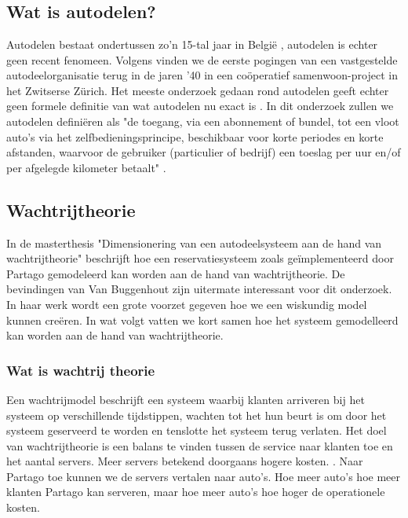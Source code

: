 \chapter{}
\label{ch:stand-van-zaken}



\section{Wat is autodelen?}
Autodelen bestaat ondertussen zo'n 15-tal jaar in België \autocite{ing}, autodelen is echter geen recent fenomeen. Volgens \textcite{millardball} vinden we de eerste pogingen van een vastgestelde autodeelorganisatie terug in de jaren '40 in een coöperatief samenwoon-project in het Zwitserse Zürich. Het meeste onderzoek gedaan rond autodelen geeft echter geen formele definitie van wat autodelen nu exact is \autocite{millardball}. In dit onderzoek zullen we autodelen definiëren als "de toegang, via een abonnement of bundel, tot een vloot auto's via het zelfbedieningsprincipe, beschikbaar voor korte periodes en korte afstanden, waarvoor de gebruiker (particulier of bedrijf) een toeslag per uur en/of per afgelegde kilometer betaalt" \autocite{ing}.

\section{Wachtrijtheorie}
In de masterthesis "Dimensionering van een autodeelsysteem aan de hand van wachtrijtheorie" beschrijft \textcite{van-buggenhout} hoe een reservatiesysteem zoals geïmplementeerd door Partago gemodeleerd kan worden aan de hand van wachtrijtheorie. De bevindingen van Van Buggenhout zijn uitermate interessant voor dit onderzoek. In haar werk wordt een grote voorzet gegeven hoe we een wiskundig model kunnen creëren. In wat volgt vatten we kort samen hoe het systeem gemodelleerd kan worden aan de hand van wachtrijtheorie.

\subsection{Wat is wachtrij theorie}
Een wachtrijmodel beschrijft een systeem waarbij klanten arriveren bij het systeem op verschillende tijdstippen, wachten tot het hun beurt is om door het systeem geserveerd te worden en tenslotte het systeem terug verlaten. Het doel van wachtrijtheorie is een balans te vinden tussen de service naar klanten toe en het aantal servers. Meer servers betekend doorgaans hogere kosten. \textcite{van-buggenhout}. Naar Partago toe kunnen we de servers vertalen naar auto's. Hoe meer auto's hoe meer klanten Partago kan serveren, maar hoe meer auto's hoe hoger de operationele kosten. 

